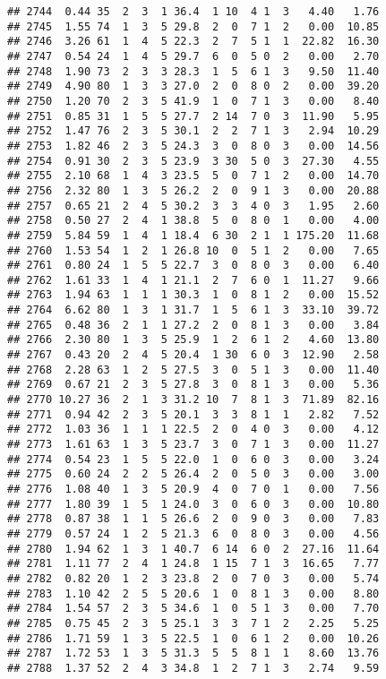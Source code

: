 \documentclass[
]{article}
\begin{document}
\begin{verbatim}
## 2744  0.44 35  2  3  1 36.4  1 10  4 1  3   4.40   1.76
## 2745  1.55 74  1  3  5 29.8  2  0  7 1  2   0.00  10.85
## 2746  3.26 61  1  4  5 22.3  2  7  5 1  1  22.82  16.30
## 2747  0.54 24  1  4  5 29.7  6  0  5 0  2   0.00   2.70
## 2748  1.90 73  2  3  3 28.3  1  5  6 1  3   9.50  11.40
## 2749  4.90 80  1  3  3 27.0  2  0  8 0  2   0.00  39.20
## 2750  1.20 70  2  3  5 41.9  1  0  7 1  3   0.00   8.40
## 2751  0.85 31  1  5  5 27.7  2 14  7 0  3  11.90   5.95
## 2752  1.47 76  2  3  5 30.1  2  2  7 1  3   2.94  10.29
## 2753  1.82 46  2  3  5 24.3  3  0  8 0  3   0.00  14.56
## 2754  0.91 30  2  3  5 23.9  3 30  5 0  3  27.30   4.55
## 2755  2.10 68  1  4  3 23.5  5  0  7 1  2   0.00  14.70
## 2756  2.32 80  1  3  5 26.2  2  0  9 1  3   0.00  20.88
## 2757  0.65 21  2  4  5 30.2  3  3  4 0  3   1.95   2.60
## 2758  0.50 27  2  4  1 38.8  5  0  8 0  1   0.00   4.00
## 2759  5.84 59  1  4  1 18.4  6 30  2 1  1 175.20  11.68
## 2760  1.53 54  1  2  1 26.8 10  0  5 1  2   0.00   7.65
## 2761  0.80 24  1  5  5 22.7  3  0  8 0  3   0.00   6.40
## 2762  1.61 33  1  4  1 21.1  2  7  6 0  1  11.27   9.66
## 2763  1.94 63  1  1  1 30.3  1  0  8 1  2   0.00  15.52
## 2764  6.62 80  1  3  1 31.7  1  5  6 1  3  33.10  39.72
## 2765  0.48 36  2  1  1 27.2  2  0  8 1  3   0.00   3.84
## 2766  2.30 80  1  3  5 25.9  1  2  6 1  2   4.60  13.80
## 2767  0.43 20  2  4  5 20.4  1 30  6 0  3  12.90   2.58
## 2768  2.28 63  1  2  5 27.5  3  0  5 1  3   0.00  11.40
## 2769  0.67 21  2  3  5 27.8  3  0  8 1  3   0.00   5.36
## 2770 10.27 36  2  1  3 31.2 10  7  8 1  3  71.89  82.16
## 2771  0.94 42  2  3  5 20.1  3  3  8 1  1   2.82   7.52
## 2772  1.03 36  1  1  1 22.5  2  0  4 0  3   0.00   4.12
## 2773  1.61 63  1  3  5 23.7  3  0  7 1  3   0.00  11.27
## 2774  0.54 23  1  5  5 22.0  1  0  6 0  3   0.00   3.24
## 2775  0.60 24  2  2  5 26.4  2  0  5 0  3   0.00   3.00
## 2776  1.08 40  1  3  5 20.9  4  0  7 0  1   0.00   7.56
## 2777  1.80 39  1  5  1 24.0  3  0  6 0  3   0.00  10.80
## 2778  0.87 38  1  1  5 26.6  2  0  9 0  3   0.00   7.83
## 2779  0.57 24  1  2  5 21.3  6  0  8 0  3   0.00   4.56
## 2780  1.94 62  1  3  1 40.7  6 14  6 0  2  27.16  11.64
## 2781  1.11 77  2  4  1 24.8  1 15  7 1  3  16.65   7.77
## 2782  0.82 20  1  2  3 23.8  2  0  7 0  3   0.00   5.74
## 2783  1.10 42  2  5  5 20.6  1  0  8 1  3   0.00   8.80
## 2784  1.54 57  2  3  5 34.6  1  0  5 1  3   0.00   7.70
## 2785  0.75 45  2  3  5 25.1  3  3  7 1  2   2.25   5.25
## 2786  1.71 59  1  3  5 22.5  1  0  6 1  2   0.00  10.26
## 2787  1.72 53  1  3  5 31.3  5  5  8 1  1   8.60  13.76
## 2788  1.37 52  2  4  3 34.8  1  2  7 1  3   2.74   9.59

\end{verbatim}
\end{document}
